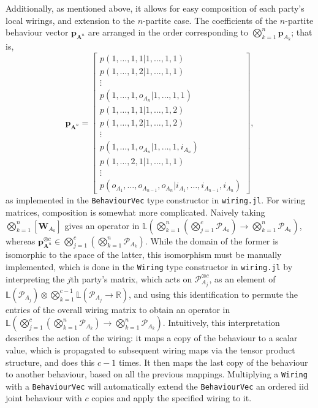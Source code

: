 \documentclass[10pt, a4paper]{article}
\numberwithin{equation}{section} %
\theoremstyle{definition}
\theoremstyle{plain}
\newcommand{\?}{\mathrel{?}} %
\newcommand{\R}{\mathbb{R}} %
\newcommand{\Lin}[1]{\mathbb{L}\left(#1\right)}
\newcommand{\cvec}[1]{\boldsymbol{\mathbf{#1}}}    %
\newcommand{\matr}[2][]{\left[\mathbf{#2}#1\right]} %
\newcommand{\sP}{\mathcal{P}}
\begin{document}
                  Additionally, as mentioned above, it allows for easy composition of each party's local wirings, and extension to the \(n\)-partite case. The coefficients of the \(n\)-partite behaviour vector \(\cvec{p}_{\cvec{A}^n}\) are arranged in the order corresponding to \(\bigotimes_{k=1}^n \cvec{p}_{A_k}\); that is,
                  \begin{equation}
                    \cvec{p}_{\cvec{A}^n} = \begin{bmatrix}
                      p(1,\ldots,1,1|1,\ldots,1,1) \\
                      p(1,\ldots,1,2|1,\ldots,1,1) \\
                      \vdots \\
                      p(1,\ldots,1,o_{A_n}|1,\ldots,1,1) \\
                      p(1,\ldots,1,1|1,\ldots,1,2) \\
                      p(1,\ldots,1,2|1,\ldots,1,2) \\
                      \vdots \\
                      p(1,\ldots,1,o_{A_n}|1,\ldots,1,i_{A_n}) \\
                      p(1,\ldots,2,1|1,\ldots,1,1) \\
                      \vdots \\
                      p(o_{A_1},\ldots,o_{A_{n-1}},o_{A_n}|i_{A_1},\ldots,i_{A_{n-1}},i_{A_n})
                    \end{bmatrix},
                  \end{equation}
                  as implemented in the \verb`BehaviourVec` type constructor in \verb`wiring.jl`. For wiring matrices, composition is somewhat more complicated. Naively taking \(\bigotimes_{k=1}^n \matr[_{A_k}]{W}\) gives an operator in \(\Lin{\bigotimes_{k=1}^n \left(\bigotimes_{j=1}^c \sP_{A_k}\right) \to \bigotimes_{k=1}^n \sP_{A_k}}\), whereas  \(\cvec{p}_{\cvec{A}^n}^{\otimes{c}} \in \bigotimes_{j=1}^c \left(\bigotimes_{k=1}^n \sP_{A_k}\right)\). While the domain of the former is isomorphic to the space of the latter, this isomorphism must be manually implemented, which is done in the \verb`Wiring` type constructor in \verb`wiring.jl` by interpreting the \(j\)th party's matrix, which acts on \(\sP_{A_j}^{\otimes c}\), as an element of \(\Lin{\sP_{A_j}} \otimes \bigotimes_{k=1}^{c-1} \Lin{\sP_{A_j} \to \R}\), and using this identification to permute the entries of the overall wiring matrix to obtain an operator in \(\Lin{\bigotimes_{j=1}^c \left(\bigotimes_{k=1}^n \sP_{A_k}\right) \to \bigotimes_{k=1}^n \sP_{A_k}}\). Intuitively, this interpretation describes the action of the wiring: it maps a copy of the behaviour to a scalar value, which is propagated to subsequent wiring maps via the tensor product structure, and does this \(c-1\) times. It then maps the last copy of the behaviour to another behaviour, based on all the previous mappings. Multiplying a \verb`Wiring` with a \verb`BehaviourVec` will automatically extend the \verb`BehaviourVec` an ordered iid joint behaviour with \(c\) copies and apply the specified wiring to it.
\end{document}
